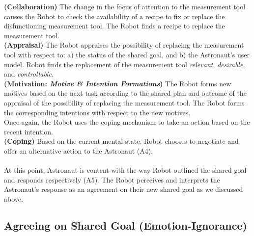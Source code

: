 \noindent\textbf{(Collaboration)} The change in the focus of attention to the
measurement tool causes the Robot to check the availability of a recipe to fix
or replace the disfunctioning measurement tool. The Robot finds a recipe to
replace the measurement tool.\\

\noindent\textbf{(Appraisal)} The Robot appraises the possibility of
replacing the measurement tool with respect to: a) the status of the shared
goal, and b) the Astronaut's user model. Robot finds the replacement of the
measurement tool \textit{relevant}, \textit{desirable}, and
\textit{controllable}.\\

\noindent\textbf{(Motivation: \textit{Motive \& Intention Formations})} The
Robot forms new motives based on the next task according to the shared plan and
outcome of the appraisal of the possibility of replacing the measurement tool.
The Robot forms the corresponding intentions with respect to the new motives.\\

\noindent Once again, the Robot uses the coping mechanism to take an action
based on the recent intention.\\

\noindent\textbf{(Coping)} Based on the current mental state, Robot
chooses to negotiate and offer an alternative action to the Astronaut (A4).\\

\noindent{}\\

At this point, Astronaut is content with the way Robot outlined the shared goal
and responds respectively (A5). The Robot perceives and interprets the
Astronaut's response as an agreement on their new shared goal as we discussed
above.\\

\noindent{}

\subsection{Agreeing on Shared Goal (Emotion-Ignorance)}
\label{sec:wt-exp2}

